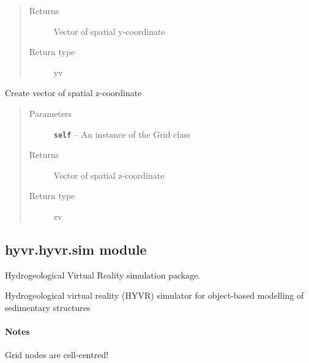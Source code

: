 \documentclass[letterpaper,10pt,english]{sphinxmanual}
\begin{document}
\begin{fulllineitems}
\begin{fulllineitems}
\begin{quote}
\begin{description}
\item[{Returns}] \leavevmode
Vector of spatial y-coordinate

\item[{Return type}] \leavevmode
yv

\end{description}\end{quote}

\end{fulllineitems}


\begin{fulllineitems}
\label{hyvr:hyvr.hyvr.grid.Grid.vec_z}
Create vector of spatial z-coordinate
\begin{quote}\begin{description}
\item[{Parameters}] \leavevmode
\textbf{\texttt{self}} -- An instance of the Grid class

\item[{Returns}] \leavevmode
Vector of spatial z-coordinate

\item[{Return type}] \leavevmode
zv

\end{description}\end{quote}

\end{fulllineitems}


\end{fulllineitems}



\subsection{hyvr.hyvr.sim module}
\label{hyvr:hyvr-hyvr-sim-module}\label{hyvr:module-hyvr.hyvr.sim}
Hydrogeological Virtual Reality simulation package.

Hydrogeological virtual reality (HYVR) simulator for object-based modelling of sedimentary structures
\paragraph{Notes}

Grid nodes are cell-centred!
\end{document}
